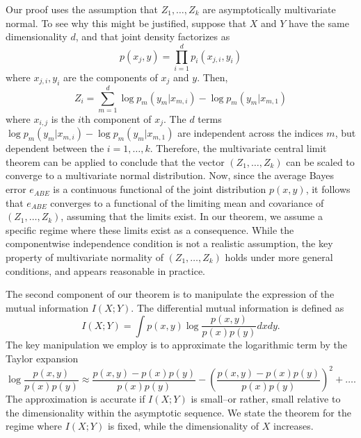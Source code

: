 \documentclass[12pt]{article}
\begin{document}
Our proof uses the assumption that $Z_1,\hdots, Z_k$ are asymptotically multivariate normal.
To see why this might be justified, suppose that $X$ and $Y$ have the same dimensionality $d$, and that
joint density factorizes as
\[
p(x_j, y) = \prod_{i=1}^d p_i(x_{j, i}, y_i)
\]
where $x_{j, i}, y_i$ are the components of $x_j$ and $y$.
Then,
\[
Z_i = \sum_{m=1}^d \log p_m(y_m | x_{m, i}) - \log p_m(y_m | x_{m, 1})
\]
where $x_{i, j}$ is the $i$th component of $x_j$.
The $d$ terms $\log p_m(y_m | x_{m, i}) - \log p_m(y_m | x_{m, 1})$ are independent across the indices $m$,
but dependent between the $i = 1,\hdots, k$.
Therefore, the multivariate central limit theorem can be applied to conclude that the vector
$(Z_1,\hdots, Z_k)$ can be scaled to converge to a multivariate normal distribution.
Now, since the average Bayes error $e_{ABE}$ is a continuous functional of the joint distribution $p(x, y)$,
it follows that $e_{ABE}$ converges to a functional of the limiting mean and covariance of $(Z_1,\hdots, Z_k)$, assuming
that the limits exist.
In our theorem, we assume a specific regime where these limits exist as a consequence.
While the componentwise independence condition is not a realistic assumption,
the key property of multivariate normality of $(Z_1,\hdots, Z_k)$ holds under more general conditions, and appears reasonable in practice.

The second component of our theorem is to manipulate the expression of the mutual information $I(X; Y)$.
The differential mutual information is defined as
\[
I(X; Y) = \int p(x, y) \log \frac{p(x, y)}{p(x) p(y)} dx dy.
\]
The key manipulation we employ is to approximate the logarithmic term by the Taylor expansion
\[
\log \frac{p(x, y)}{p(x) p(y)} \approx \frac{p(x, y) - p(x) p(y)}{p(x) p(y)} - \left(\frac{p(x, y) - p(x) p(y)}{p(x) p(y)}\right)^2 + \hdots.
\]
The approximation is accurate if $I(X; Y)$ is small--or rather, small relative to the dimensionality within the asymptotic sequence.
We state the theorem for the regime where $I(X; Y)$ is fixed, while the dimensionality of $X$ increases.
\end{document}
